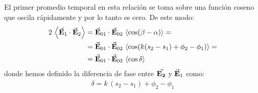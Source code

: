 \documentclass[14pt]{extarticle}
\begin{document}
El primer promedio temporal en esta relación se toma sobre una función coseno que oscila rápidamente y por lo tanto es cero. De este modo:
\begin{align}
\begin{aligned}[b]
2 \, \expval{\va{E}_{1} \cdot \va{E}_{2}} &= \va{E}_{01} \cdot \va{E}_{02} \, \expval{\cos (\beta -\alpha)} = \\
&= \va{E}_{01} \cdot \va{E}_{02} \, \expval{ \cos(k (s_{2} - s_{1}) + \phi_{2} - \phi_{1})} = \\
&= \va{E}_{01} \cdot \va{E}_{02} \, \expval{\cos \delta}
\end{aligned}
\label{eq:ecuacion_07_07}
\end{align}
donde hemos definido la diferencia de fase entre $\va{E_{2}}$ y $\va{E}_{1}$ como:
\begin{align}
\delta = k \, (s_{2} - s_{1}) + \phi_{2} - \phi_{1}
\label{eq:ecuacion_07_08}
\end{align}
\end{document}
